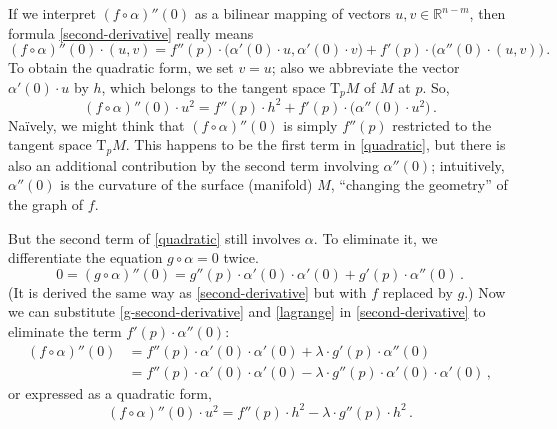 \documentclass[12pt]{article}
\newcommand{\real}{\mathbb{R}}
\begin{document}
If we interpret $(f \circ \alpha)''(0)$ as a bilinear mapping of vectors $u,v \in \real^{n-m}$,
then formula \eqref{second-derivative} really means
\begin{equation}\label{bilinear}
(f \circ \alpha)''(0) \cdot (u, v) = 
f''(p) \cdot \bigl(\alpha'(0)\cdot u, \alpha'(0) \cdot v\bigr) + f'(p) \cdot \bigl(\alpha''(0) \cdot (u, v)\bigr)\,.
\end{equation}
To obtain the quadratic form, we set $v = u$; also we abbreviate the vector $\alpha'(0) \cdot u$ by $h$,
which belongs to the tangent space $\mathrm{T}_p M$ of $M$ at $p$. So,
\begin{equation}\label{quadratic}
(f \circ \alpha)''(0) \cdot u^2 = 
f''(p) \cdot h^2 + f'(p) \cdot \bigl(\alpha''(0) \cdot u^2 \bigr)\,.
\end{equation}
Na\"ively, we might think that $(f \circ \alpha)''(0)$ is simply
$f''(p)$ restricted to the tangent space $\mathrm{T}_p M$.
This happens to be the first term in \eqref{quadratic}, but there is also
an additional contribution by the second term involving $\alpha''(0)$;
intuitively, $\alpha''(0)$ is the curvature of the surface (manifold) $M$,
``changing the geometry'' of the graph of $f$.

But the second term of \eqref{quadratic} still involves $\alpha$.
To eliminate it, we differentiate the equation $g \circ \alpha = 0$ twice.
\begin{equation}\label{g-second-derivative}
0 = (g \circ \alpha)''(0) = g''(p) \cdot \alpha'(0) \cdot \alpha'(0) + g'(p) \cdot \alpha''(0)\,.
\end{equation}
(It is derived the same way as \eqref{second-derivative} but with $f$ replaced by $g$.)
Now we can substitute \eqref{g-second-derivative} and \eqref{lagrange}
in \eqref{second-derivative} to eliminate the term $f'(p) \cdot \alpha''(0)$:
\begin{equation}\label{ff-second-derivative}
\begin{split}
(f \circ \alpha)''(0) &= f''(p) \cdot \alpha'(0) \cdot \alpha'(0) + \lambda \cdot g'(p) \cdot \alpha''(0) \\
&= f''(p) \cdot \alpha'(0) \cdot \alpha'(0) - \lambda \cdot g''(p) \cdot \alpha'(0) \cdot \alpha'(0)\,,
\end{split}
\end{equation}
or expressed as a quadratic form,
\begin{equation}\label{ff-quadratic}
(f \circ \alpha)''(0) \cdot u^2 = f''(p) \cdot h^2 - \lambda \cdot g''(p) \cdot h^2\,.
\end{equation}
\end{document}
